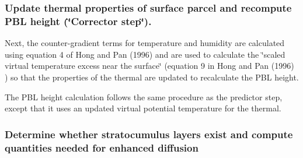 \subsubsection*{Update thermal properties of surface parcel and recompute P\+BL height (\char`\"{}\+Corrector step\char`\"{}).}

Next, the counter-\/gradient terms for temperature and humidity are calculated using equation 4 of Hong and Pan (1996) \cite{hong_and_pan_1996} and are used to calculate the \char`\"{}scaled virtual temperature excess near the surface\char`\"{} (equation 9 in Hong and Pan (1996) \cite{hong_and_pan_1996}) so that the properties of the thermal are updated to recalculate the P\+BL height.

The P\+BL height calculation follows the same procedure as the predictor step, except that it uses an updated virtual potential temperature for the thermal.

\subsubsection*{Determine whether stratocumulus layers exist and compute quantities needed for enhanced diffusion}


